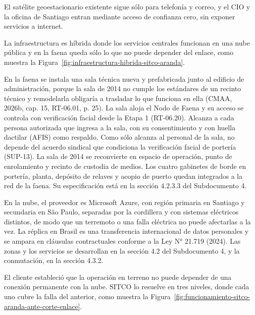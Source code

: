 \documentclass[subdoc]{../../comun/overfore}
\begin{document}
El satélite geoestacionario existente sigue sólo para telefonía y correo, y el CIO y la oficina de Santiago entran mediante acceso de confianza cero, sin exponer servicios a internet.

La infraestructura es híbrida donde los servicios centrales funcionan en una nube pública y en la faena queda sólo lo que no puede depender del enlace, como muestra la Figura~\ref{fig:infraestructura-hibrida-sitco-aranda}.

\begin{horizontal}
\end{horizontal}
En la faena se instala una sala técnica nueva y prefabricada junto al edificio de administración, porque la sala de 2014 no cumple los estándares de un recinto técnico y remodelarla obligaría a trasladar lo que funciona en ella (CMAA, 2026b, cap. 15, RT-06.01, p. 25). La sala aloja el Nodo de Faena y su acceso se controla con verificación facial desde la Etapa 1 (RT-06.20). Alcanza a cada persona autorizada que ingresa a la sala, con su consentimiento y con huella dactilar (AFIS) como respaldo. Como sólo alcanza al personal de la sala, no depende del acuerdo sindical que condiciona la verificación facial de portería (SUP-13). La sala de 2014 se reconvierte en espacio de operación, punto de enrolamiento y recinto de custodia de medios. Los cuatro gabinetes de borde en portería, planta, depósito de relaves y acopio de puerto quedan integrados a la red de la faena. Su especificación está en la sección 4.2.3.3 del Subdocumento 4.

En la nube, el proveedor es Microsoft Azure, con región primaria en Santiago y secundaria en São Paulo, separadas por la cordillera y con sistemas eléctricos distintos, de modo que un terremoto o una falla eléctrica no puede afectarlas a la vez. La réplica en Brasil es una transferencia internacional de datos personales y se ampara en cláusulas contractuales conforme a la Ley N° 21.719 (2024). Las zonas y los servicios se desarrollan en la sección 4.2 del Subdocumento 4, y la conmutación, en la sección 4.3.2.

El cliente estableció que la operación en terreno no puede depender de una conexión permanente con la nube. SITCO lo resuelve en tres niveles, donde cada uno cubre la falla del anterior, como muestra la Figura~\ref{fig:funcionamiento-sitco-aranda-ante-corte-enlace}.
\end{document}
